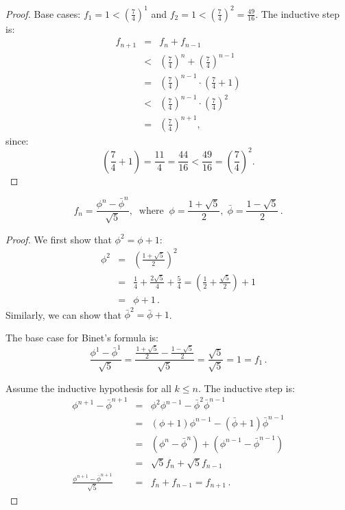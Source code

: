 \begin{proof}
Base cases: $f_1=1<\left(\displaystyle\frac{7}{4}\right)^1$ and $f_2=1<\left(\displaystyle\frac{7}{4}\right)^2=\displaystyle\frac{49}{16}$. The inductive step is:
\begin{eqnarray*}
f_{n+1}&=&f_n+f_{n-1}\\
&<&\left(\frac{7}{4}\right)^n + \left(\frac{7}{4}\right)^{n-1}\\
&=&\left(\frac{7}{4}\right)^{n-1}\cdot\left(\frac{7}{4}+1\right)\\
&<&\left(\frac{7}{4}\right)^{n-1}\cdot\left(\frac{7}{4}\right)^2\\
&=&\left(\frac{7}{4}\right)^{n+1},
\end{eqnarray*}
since:
\[
\left(\frac{7}{4}+1\right) = \frac{11}{4} = \frac{44}{16}<\frac{49}{16}=\left(\frac{7}{4}\right)^2.
\]
\end{proof}


\begin{theorem}

\begin{displaymath}
f_n = \frac{\phi^n - \bar{\phi}^n}{\sqrt{5}}, \;\; \mathrm{where} \;\;
\phi = \frac{1+\sqrt{5}}{2},\;\bar{\phi} = \frac{1-\sqrt{5}}{2}\,.
\end{displaymath}
\end{theorem}

\begin{proof}
We first show that $\phi^2=\phi+1$:
\begin{eqnarray*}
\phi^2 &=& \left(\frac{1+\sqrt{5}}{2}\right)^2\\
&=& \frac{1}{4} + \frac{2\sqrt{5}}{4} + \frac{5}{4}= \left(\frac{1}{2} + \frac{\sqrt{5}}{2}\right) + 1\\
&=&\phi + 1\,.
\end{eqnarray*}
Similarly, we can show that $\bar{\phi}^2=\bar{\phi}+1$.

The base case for Binet's formula is:
\[
\frac{\phi^1 - \bar{\phi}^1}{\sqrt{5}}=\frac{\frac{1+\sqrt{5}}{2}-\frac{1-\sqrt{5}}{2}}{\sqrt{5}}=\frac{\sqrt{5}}{\sqrt{5}}=1=f_1\,.
\]

\newpage

Assume the inductive hypothesis for all $k\leq n$. The inductive step is:
\begin{eqnarray*}
\phi^{n+1} - \bar{\phi}^{n+1} &=& \phi^2\phi^{n-1} - \bar{\phi}^2\bar{\phi}^{n-1}\\
&=&(\phi+1)\phi^{n-1} - (\bar{\phi}+1)\bar{\phi}^{n-1}\\
&=&(\phi^{n} - \bar{\phi}^{n}) + (\phi^{n-1} - \bar{\phi}^{n-1})\\
&=&\sqrt{5}f_{n} + \sqrt{5}f_{n-1}\\
\frac{\phi^{n+1} - \bar{\phi}^{n+1}}{\sqrt{5}} &=& f_{n} + f_{n-1} = f_{n+1}\,.
\end{eqnarray*}
\end{proof}

